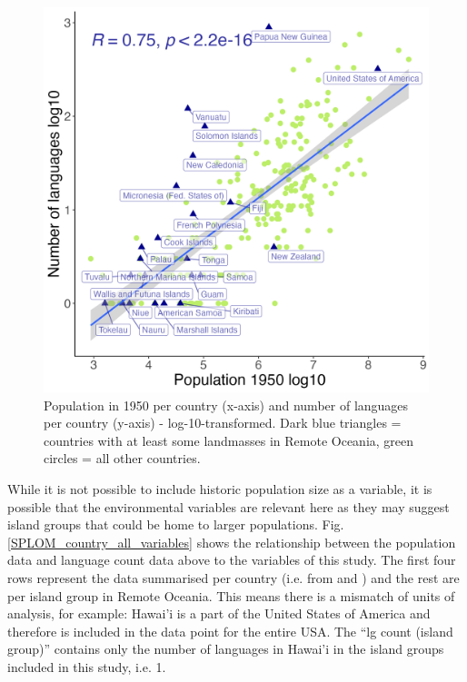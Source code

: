 \documentclass[unnumsec,webpdf,modern,medium]{oup-authoring-template}
\begin{document}
\begin{appendices}
\begin{figure}[ht]
    \centering
          \includegraphics[width=.7\textwidth]{number_of_languages_vs_pop_1950_log10}
    \caption{Population in 1950 per country (x-axis) and number of languages per country (y-axis) - log-10-transformed. Dark blue triangles = countries with at least some landmasses in Remote Oceania, green circles = all other countries.}
    \label{fig:un_pop_plot_log10}
    \end{figure}

While it is not possible to include historic population size as a variable, it is possible that the environmental variables are relevant here as they may suggest island groups that could be home to larger populations. Fig. \ref{SPLOM_country_all_variables} shows the relationship between the population data and language count data above to the variables of this study. The first four rows represent the data summarised per country (i.e. from  \citet{UN_pop} and \citet{glottolog3}) and the rest are per island group in Remote Oceania. This means there is a mismatch of units of analysis, for example: Hawai'i is a part of the United States of America and therefore is included in the data point for the entire USA. The ``lg count (island group)'' contains only the number of languages in Hawai'i in the island groups included in this study, i.e. 1.


\end{appendices}
\end{document}
